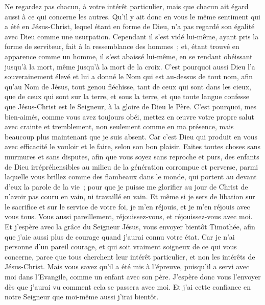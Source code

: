 \begin{multicols}{2}
Ne regardez pas chacun, à votre intérêt particulier, mais que chacun ait égard aussi à ce qui concerne les autres.
Qu'il y ait donc en vous le même sentiment qui a été en Jésus-Christ,
lequel étant en forme de Dieu, n'a pas regardé son égalité avec Dieu comme une usurpation.
Cependant il s'est vidé lui-même, ayant pris la forme de serviteur, fait à la ressemblance des hommes~;
et, étant trouvé en apparence comme un homme, il s'est abaissé lui-même, en se rendant obéissant jusqu'à la mort, même jusqu'à la mort de la croix.
C'est pourquoi aussi Dieu l'a souverainement élevé et lui a donné le Nom qui est au-dessus de tout nom,
afin qu'au Nom de Jésus, tout genou fléchisse, tant de ceux qui sont dans les cieux, que de ceux qui sont sur la terre, et sous la terre,
et que toute langue confesse que Jésus-Christ est le Seigneur, à la gloire de Dieu le Père.
C'est pourquoi, mes bien-aimés, comme vous avez toujours obéi, mettez en œuvre votre propre salut avec crainte et tremblement, non seulement comme en ma présence, mais beaucoup plus maintenant que je suis absent.
Car c'est Dieu qui produit en vous avec efficacité le vouloir et le faire, selon son bon plaisir.
Faites toutes choses sans murmures et sans disputes,
afin que vous soyez sans reproche et purs, des enfants de Dieu irrépréhensibles au milieu de la génération corrompue et perverse, parmi laquelle vous brillez comme des flambeaux dans le monde, qui portent au devant d'eux la parole de la vie~;
pour que je puisse me glorifier au jour de Christ de n'avoir pas couru en vain, ni travaillé en vain.
Et même si je sers de libation sur le sacrifice et sur le service de votre foi, je m'en réjouis, et je m'en réjouis avec vous tous.
Vous aussi pareillement, réjouissez-vous, et réjouissez-vous avec moi.
Et j'espère avec la grâce du Seigneur Jésus, vous envoyer bientôt Timothée, afin que j'aie aussi plus de courage quand j'aurai connu votre état.
Car je n'ai personne d'un pareil courage, et qui soit vraiment soigneux de ce qui vous concerne,
parce que tous cherchent leur intérêt particulier, et non les intérêts de Jésus-Christ.
Mais vous savez qu'il a été mis à l'épreuve, puisqu'il a servi avec moi dans l'Evangile, comme un enfant avec son père.
J'espère donc vous l'envoyer dès que j'aurai vu comment cela se passera avec moi.
Et j'ai cette confiance en notre Seigneur que moi-même aussi j'irai bientôt.

\end{multicols}
